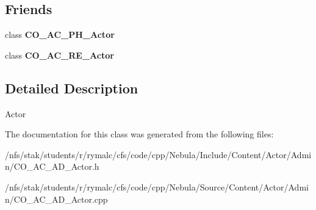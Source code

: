 \subsection*{Friends}
\begin{DoxyCompactItemize}
\item 
\hypertarget{classContent_1_1Actor_1_1Admin_1_1Actor_a9f65e807dba2290f6437a4899292be00}{
class {\bfseries CO\_\-AC\_\-PH\_\-Actor}}
\label{classContent_1_1Actor_1_1Admin_1_1Actor_a9f65e807dba2290f6437a4899292be00}

\item 
\hypertarget{classContent_1_1Actor_1_1Admin_1_1Actor_a09761fd3989a5ba02ae8b8520fdaff63}{
class {\bfseries CO\_\-AC\_\-RE\_\-Actor}}
\label{classContent_1_1Actor_1_1Admin_1_1Actor_a09761fd3989a5ba02ae8b8520fdaff63}

\end{DoxyCompactItemize}


\subsection{Detailed Description}
Actor 

The documentation for this class was generated from the following files:\begin{DoxyCompactItemize}
\item 
/nfs/stak/students/r/rymalc/cfs/code/cpp/Nebula/Include/Content/Actor/Admin/CO\_\-AC\_\-AD\_\-Actor.h\item 
/nfs/stak/students/r/rymalc/cfs/code/cpp/Nebula/Source/Content/Actor/Admin/CO\_\-AC\_\-AD\_\-Actor.cpp\end{DoxyCompactItemize}
